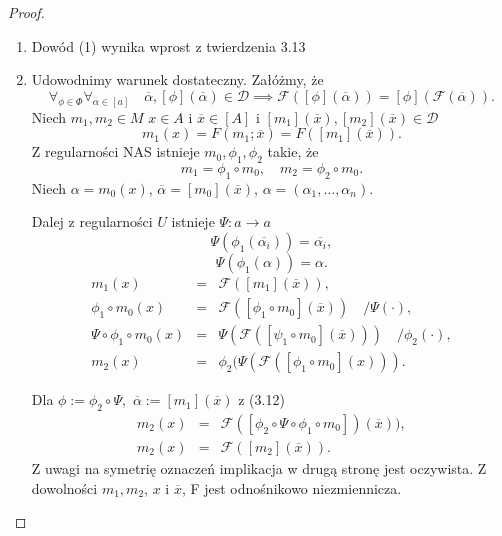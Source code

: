\documentclass[12pt,a4paper]{report}
\newcommand{\domkniecie}[1]{\left[ {#1} \right] }
\begin{document}
\begin{proof} 
\begin{enumerate}
\item
Dowód (1) wynika wprost z twierdzenia 3.13
\item
Udowodnimy warunek dostateczny. Załóżmy, że 
\begin{equation}
\forall_{\phi \in \Phi} \forall_{\overline{\alpha} \in \domkniecie{a}} \quad \overline{\alpha}, \domkniecie{\phi}(\overline{\alpha}) \in \mathcal{D} \implies \mathcal{F}(\domkniecie{\phi}(\overline{\alpha}))=\domkniecie{\phi}(\mathcal{F}(\overline{\alpha})).
\end{equation}
Niech $m_1, m_2 \in M$ $x \in A$ i $\overline{x} \in \domkniecie{A}$ i $\domkniecie{m_1}(\overline{x}), \domkniecie{m_2}(\overline{x}) \in \mathcal{D}$
$$
m_1(x)=F(m_1;\overline{x})=F(\domkniecie{m_1}(\overline{x})).
$$
Z regularności NAS istnieje $m_0, \phi_1 , \phi_2$ takie, że 
$$ 
m_1=\phi_1\circ m_0, \quad m_2=\phi_2\circ m_0.
$$
Niech $\alpha=m_0(x)$, $\overline{\alpha}=\domkniecie{m_0}(\overline{x})$, $\alpha=(\alpha_1,\dots,\alpha_n)$.

Dalej z regularności $U$ istnieje $\Psi:a \to a$
$$
 \Psi(\phi_1(\overline{\alpha_i}))=\overline{\alpha_i},
$$
$$
 \Psi(\phi_1(\alpha))=\alpha.
$$
\begin{eqnarray*}
m_1(x) & = & \mathcal{F}(\domkniecie{m_1}(\overline{x})),\\ 
\phi_1 \circ m_0(x)& = & \mathcal{F}(\domkniecie{\phi_1 \circ m_0}(\overline{x}))\quad /\Psi(\cdot),\\ 
\Psi \circ \phi_1 \circ m_0(x)&= & \Psi(\mathcal{F}(\domkniecie{\psi_1 \circ m_0}(\overline{x})))\quad /\phi_2(\cdot),\\
m_2(x)&=&\phi_2(\Psi(\mathcal{F}(\domkniecie{\phi_1 \circ m_0}(x))).
\end{eqnarray*}

Dla $\phi:=\phi_2\circ \Psi,$ $\overline{\alpha}:=\domkniecie{m_1}(\overline{x})$ z (3.12)
\begin{eqnarray*}
m_2(x) & = & \mathcal{F}(\domkniecie{\phi_2 \circ \Psi \circ \phi_1 \circ m_0})(\overline{x})),\\
m_2(x) & = & \mathcal{F}(\domkniecie{m_2}(\overline{x})).
\end{eqnarray*}
Z uwagi na symetrię oznaczeń implikacja w drugą stronę jest oczywista. Z dowolności $m_1, m_2$, $x$ i $\overline{x}$, F jest odnośnikowo niezmiennicza.


\end{enumerate}
\end{proof}
\end{document}
